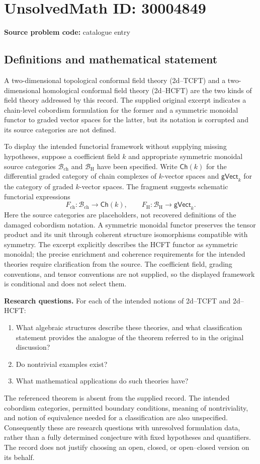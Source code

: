 \documentclass[11pt]{article}
\begin{document}
\section*{UnsolvedMath ID: 30004849}
\textbf{Source problem code:} catalogue entry
\subsection{Definitions and mathematical statement}
A two-dimensional topological conformal field theory (2d--TCFT) and a two-dimensional homological conformal field theory (2d--HCFT) are the two kinds of field theory addressed by this record. The supplied original excerpt indicates a chain-level cobordism formulation for the former and a symmetric monoidal functor to graded vector spaces for the latter, but its notation is corrupted and its source categories are not defined.

To display the intended functorial framework without supplying missing hypotheses, suppose a coefficient field \(k\) and appropriate symmetric monoidal source categories \(\mathcal B_{\mathrm{ch}}\) and \(\mathcal B_{\mathrm H}\) have been specified. Write \(\mathsf{Ch}(k)\) for the differential graded category of chain complexes of \(k\)-vector spaces and \(\mathsf{gVect}_k\) for the category of graded \(k\)-vector spaces. The fragment suggests schematic functorial expressions
\[
F_{\mathrm{ch}}\colon \mathcal B_{\mathrm{ch}}\longrightarrow\mathsf{Ch}(k),
\qquad
F_{\mathrm H}\colon \mathcal B_{\mathrm H}\longrightarrow\mathsf{gVect}_k.
\]
Here the source categories are placeholders, not recovered definitions of the damaged cobordism notation. A symmetric monoidal functor preserves the tensor product and its unit through coherent structure isomorphisms compatible with symmetry. The excerpt explicitly describes the HCFT functor as symmetric monoidal; the precise enrichment and coherence requirements for the intended theories require clarification from the source. The coefficient field, grading conventions, and tensor conventions are not supplied, so the displayed framework is conditional and does not select them.

\textbf{Research questions.} For each of the intended notions of 2d--TCFT and 2d--HCFT:
\begin{enumerate}
\item What algebraic structures describe these theories, and what classification statement provides the analogue of the theorem referred to in the original discussion?
\item Do nontrivial examples exist?
\item What mathematical applications do such theories have?
\end{enumerate}
The referenced theorem is absent from the supplied record. The intended cobordism categories, permitted boundary conditions, meaning of nontriviality, and notion of equivalence needed for a classification are also unspecified. Consequently these are research questions with unresolved formulation data, rather than a fully determined conjecture with fixed hypotheses and quantifiers. The record does not justify choosing an open, closed, or open--closed version on its behalf.
\end{document}
